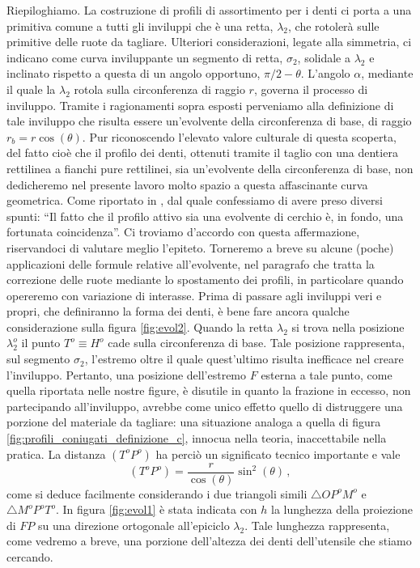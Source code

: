 \noindent Riepiloghiamo. La costruzione di profili di assortimento per i denti
ci porta a una primitiva comune a tutti gli inviluppi
che \`e una retta, $\lambda_2$, che rotoler\`a sulle primitive delle ruote da
tagliare.  Ulteriori 
considerazioni, legate alla simmetria, ci indicano come curva inviluppante
un segmento di retta, $\sigma_2$, solidale a $\lambda_2$ e inclinato
rispetto a questa di un angolo opportuno, $\pi/2 -\theta$. L'angolo $\alpha$,
mediante il quale la $\lambda_2$ rotola sulla circonferenza di raggio
$r$, governa il processo di inviluppo. Tramite i ragionamenti sopra esposti
perveniamo alla definizione di tale inviluppo che risulta essere
un'evolvente della circonferenza di base, di raggio $r_b=r \cos(\theta)$.
Pur riconoscendo l'elevato valore culturale 
di questa scoperta, del fatto cio\`e che il profilo dei denti, ottenuti tramite
il taglio con una dentiera rettilinea a fianchi pure rettilinei, sia un'evolvente
della circonferenza
di base, non dedicheremo nel presente lavoro molto spazio a questa affascinante
curva geometrica. Come riportato in \cite{guiggiani},
dal quale confessiamo di avere preso diversi spunti: ``Il fatto che il
profilo attivo sia una evolvente di cerchio \`e, in fondo, una fortunata
coincidenza''.
Ci troviamo d'accordo con questa affermazione, riservandoci
 di valutare meglio l'epiteto. Torneremo a breve
su alcune (poche) applicazioni delle formule relative all'evolvente,
nel paragrafo che tratta la correzione delle ruote mediante lo spostamento
dei profili, in particolare quando opereremo con variazione di interasse.
\noindent Prima di passare agli inviluppi veri e propri, che definiranno
la forma dei denti, \`e bene fare ancora qualche considerazione sulla
figura \ref{fig:evol2}. Quando la retta $\lambda_2$ si trova nella
posizione $\lambda^o_2$ il punto $T^o\equiv H^o$ cade sulla circonferenza
di base. Tale posizione rappresenta, sul segmento $\sigma_2$,
l'estremo oltre il quale quest'ultimo risulta inefficace nel creare
l'inviluppo. Pertanto, una posizione dell'estremo $F$ esterna a tale punto,
come quella riportata nelle  nostre figure, \`e  disutile
 in quanto la frazione in eccesso, non partecipando all'inviluppo, avrebbe come
unico effetto quello di distruggere una porzione 
del materiale da tagliare: una situazione analoga a quella
di figura \ref{fig:profili_coniugati_definizione_c}, innocua nella teoria,
inaccettabile nella pratica. La distanza $(T^oP^o)$ ha perci\`o
un significato tecnico importante e vale
\begin{equation}
(T^oP^o)=\frac{r }{\cos(\theta)}\sin^2(\theta)\,,
\label{eq:maxt}
\end{equation}
come si deduce facilmente considerando i due triangoli simili
$\triangle{OP^oM^o}$ e $\triangle{M^oP^oT^o}$.
In figura \ref{fig:evol1} \`e stata indicata con $h$ la lunghezza della
proiezione di $FP$ su una direzione ortogonale all'epiciclo $\lambda_2$. Tale
lunghezza rappresenta, come vedremo a breve, una porzione
dell'altezza dei denti dell'utensile che stiamo cercando. 

